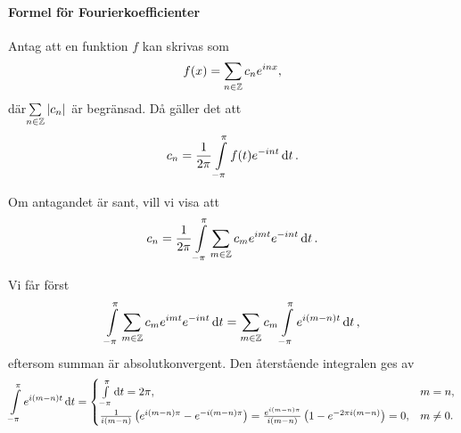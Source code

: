 \paragraph{Formel för Fourierkoefficienter}
Antag att en funktion $f$ kan skrivas som
\begin{align*}
	f(x) = \sum\limits_{n\in\mathbb{Z}}c_{n}e^{inx},
\end{align*}
där$\sum\limits_{n\in\mathbb{Z}}\abs{c_{n}}$ är begränsad. Då gäller det att
\begin{align*}
	c_{n} = \frac{1}{2\pi}\int\limits_{-\pi}^{\pi}f(t)e^{-int}\dd{t}.
\end{align*}

\proof
Om antagandet är sant, vill vi visa att
\begin{align*}
	c_{n} = \frac{1}{2\pi}\int\limits_{-\pi}^{\pi}\sum\limits_{m\in\mathbb{Z}}c_{m}e^{imt}e^{-int}\dd{t}.
\end{align*}

Vi får först
\begin{align*}
	\int\limits_{-\pi}^{\pi}\sum\limits_{m\in\mathbb{Z}}c_{m}e^{imt}e^{-int}\dd{t} = \sum\limits_{m\in\mathbb{Z}}c_{m}\int\limits_{-\pi}^{\pi}e^{i(m - n)t}\dd{t},
\end{align*}
eftersom summan är absolutkonvergent. Den återstående integralen ges av
\begin{align*}
	\int\limits_{-\pi}^{\pi}e^{i(m - n)t}\dd{t} =
	\begin{cases}
		\int\limits_{-\pi}^{\pi}\dd{t} = 2\pi,                                       &m = n, \\
		\frac{1}{i(m - n)}\left(e^{i(m - n)\pi} - e^{-i(m - n)\pi}\right) = \frac{e^{i(m - n)\pi}}{i(m - n)}\left(1 - e^{-2\pi i(m - n)}\right) = 0, &m\neq 0.
	\end{cases}
\end{align*}

